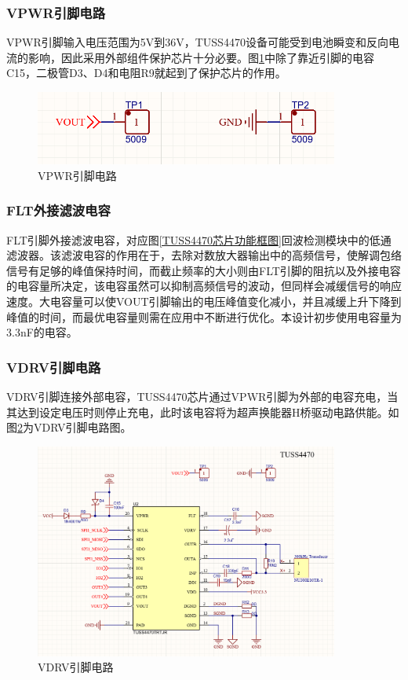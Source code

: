     \subsubsection{VPWR引脚电路}
    VPWR引脚输入电压范围为5V到36V，TUSS4470设备可能受到电池瞬变和反向电流的影响，因此采用外部组件保护芯片十分必要。图\ref{VPWR引脚}中除了靠近引脚的电容C15，二极管D3、D4和电阻R9就起到了保护芯片的作用。
     \begin{figure}[H]
    	\centering
    	\includegraphics[width=10cm]{figure/vout pin.png}
    	\songti{}\caption{VPWR引脚电路}
    	\label{VPWR引脚}
    \end{figure}
    
    \subsubsection{FLT外接滤波电容}
    FLT引脚外接滤波电容，对应图\ref{TUSS4470芯片功能框图}回波检测模块中的低通滤波器。该滤波电容的作用在于，去除对数放大器输出中的高频信号，使解调包络信号有足够的峰值保持时间，而截止频率的大小则由FLT引脚的阻抗以及外接电容的电容量所决定，该电容虽然可以抑制高频信号的波动，但同样会减缓信号的响应速度。大电容量可以使VOUT引脚输出的电压峰值变化减小，并且减缓上升下降到峰值的时间，而最优电容量则需在应用中不断进行优化。本设计初步使用电容量为3.3nF的电容。
    \subsubsection{VDRV引脚电路}
    VDRV引脚连接外部电容，TUSS4470芯片通过VPWR引脚为外部的电容充电，当其达到设定电压时则停止充电，此时该电容将为超声换能器H桥驱动电路供能。如图\ref{VDRV引脚电路}为VDRV引脚电路图。
        \begin{figure}[H]
    	\centering
    	\includegraphics[width=10cm]{figure/TUSS4470 peripheral circuit.png}
    	\songti{}\caption{VDRV引脚电路}
    	\label{VDRV引脚电路}
    \end{figure}
